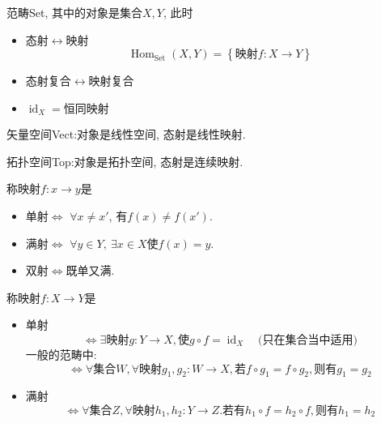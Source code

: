 \begin{example}
    范畴Set, 其中的对象是集合$X,Y$, 此时
    \begin{itemize}
        \item 态射$\longleftrightarrow$映射
        \begin{equation}
          \operatorname{Hom}_{\text{Set}} (X,Y) = \left\{ \text{映射}f\colon X \rightarrow Y \right\} 
        \end{equation}

        \item 态射复合$\longleftrightarrow$映射复合
        
        \item $\operatorname{id}_{X} = \text{恒同映射}$
    \end{itemize}
\end{example}

\begin{example}
    矢量空间Vect:对象是线性空间, 态射是线性映射.

\end{example}

\begin{example}
    拓扑空间Top:对象是拓扑空间, 态射是连续映射.
\end{example}

\begin{definition}[集合论中]
    称映射$f \colon x \to y$是
    \begin{itemize}
        \item 单射$\iff$ $\forall x \neq x'$, 有$f(x)\neq f(x')$.
        \item 满射$\iff$ $\forall y\in Y, \ \exists x\in X \text{使}f(x) = y$.
        \item 双射$\iff$既单又满.
    \end{itemize}
\end{definition}

\begin{definition}
    称映射$f\colon X\to Y$是
    \begin{itemize}
        \item 单射
        \begin{equation}
          \iff \exists \text{映射}g \colon Y \to  X, \text{使} g\circ f = \operatorname{id}_{X} \quad \text{(只在集合当中适用)}
        \end{equation}
        一般的范畴中:
        \begin{equation}
          \iff \forall \text{集合}W, \forall \text{映射} g_1, g_2 \colon W \to X ,\text{若} f \circ g_1 = f\circ g_2, \text{则有} g_1=g_2
        \end{equation}

        \item 满射
        \begin{equation}
          \iff\forall \text{集合}Z , \forall \text{映射}h_1,h_2 \colon Y\to Z .
          \text{若有}h_1\circ f = h_2 \circ f , \text{则有}h_1=h_2
        \end{equation}
    \end{itemize}
\end{definition}


